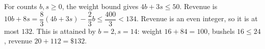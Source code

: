 For counts $b,s\ge0$, the weight bound gives $4b+3s\le50$. Revenue is $10b+8s=\dfrac{8}{3}(4b+3s)-\dfrac{2}{3}b\le\dfrac{400}{3}<134$. Revenue is an even integer, so it is at most $132$. This is attained by $b=2,s=14$: weight $16+84=100$, bushels $16\le24$, revenue $20+112=\boxed{\$132}$.
